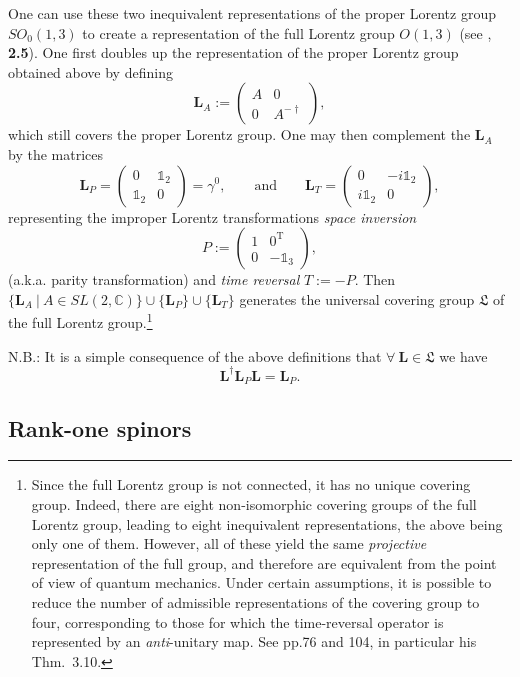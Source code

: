\documentclass[11pt]{article}
\theoremstyle{definition}
\numberwithin{equation}{section}
\newcommand{\bL}{\mathbf{L}}
\newcommand{\beq}{\begin{equation}}
\newcommand{\eeq}{\end{equation}}
\newcommand{\Id}{\mathds{1}}
\newcommand{\fL}{\mathfrak{L}}
\newcommand{\Cset}{{\mathbb C}}
\newcommand{\ga}{\gamma}
\begin{document}
 One can use these two inequivalent representations of the proper Lorentz group $SO_0(1,3)$  to create a representation of the full 
Lorentz group $O(1,3)$ (see \cite{ThallerBOOK},  {\bf 2.5}). 
 One first doubles up the representation of the proper Lorentz group obtained above by defining 
\beq 
\bL_A := \left(\begin{array}{cc} A & 0 \\ 0 & A^{-\dagger} \end{array}\right),
\eeq
which still covers the proper Lorentz group.
  One may then complement the $\bL_A$ by the matrices 
\beq 
\bL_P = \left(\begin{array}{cc} 0 & \Id_2\\ \Id_2 & 0 \end{array}\right) = \ga^0,
\qquad\mbox{and}\qquad
 \bL_T = \left(\begin{array}{cc} 0 & -i\Id_2\\ i\Id_2 & 0 \end{array}\right),
\eeq
representing the improper Lorentz transformations \emph{space inversion} 
\beq\label{def:Pinver}
P := \left(\begin{array}{cc} 1 & 0^{\mathrm{T}} \\ 0 & -\Id_3\end{array}\right),
\eeq
(a.k.a. parity transformation) 
and \emph{time reversal} $T := -P$.
 Then $\{ \bL_A \ |\ A \in SL(2,\Cset)\}\cup\{\bL_P\}\cup\{\bL_T\}$ generates the universal covering group $\fL$ 
of the full Lorentz group.\footnote{Since the full Lorentz group is not connected, it has no unique covering group. 
Indeed, there are eight non-isomorphic covering groups of the full Lorentz group, leading to eight inequivalent representations, 
the above being only one of them.  
 However, all of these yield the same {\em projective} representation of the full group, and 
therefore are equivalent from the point of view of quantum mechanics. 
 Under certain assumptions, it is possible to reduce the number of admissible representations of the covering group to four, 
corresponding to those for which the time-reversal operator is represented by an {\em anti}-unitary map. 
See \cite{ThallerBOOK} pp.76 and 104, in particular his Thm.~3.10.}  

 N.B.: It is a simple consequence of the above definitions that $\forall\ \bL \in \fL$ we have
\beq \label{LPprop}
\bL^\dag \bL_P \bL = \bL_P.
\eeq


\subsection{Rank-one spinors}
\end{document}
